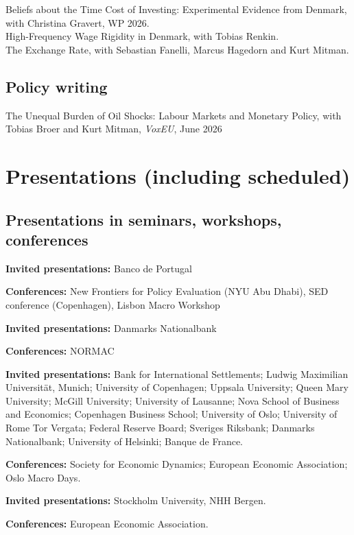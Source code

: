 \documentclass[11pt]{article} %
\begin{document}
Beliefs about the Time Cost of Investing: Experimental Evidence from Denmark, with Christina Gravert, WP 2026. \\

High-Frequency Wage Rigidity in Denmark, with Tobias Renkin.  \\

The Exchange Rate, with Sebastian Fanelli, Marcus Hagedorn and Kurt Mitman.

\subsection*{Policy writing}

The Unequal Burden of Oil Shocks: Labour Markets and Monetary Policy, with Tobias Broer and Kurt Mitman, \textit{VoxEU}, June 2026

\section*{Presentations (including scheduled)}

\subsection*{Presentations in seminars, workshops, conferences}
 \textbf{Invited presentations:} Banco de Portugal

 \textbf{Conferences:} New Frontiers for Policy Evaluation (NYU Abu Dhabi), SED conference (Copenhagen), Lisbon Macro Workshop

 \textbf{Invited presentations:} Danmarks Nationalbank

 \textbf{Conferences:} NORMAC

\textbf{Invited presentations:} Bank for International Settlements; Ludwig Maximilian Universit\"at, Munich; University of Copenhagen; Uppsala University; Queen Mary University; McGill University; University of Lausanne; Nova School of Business and Economics; Copenhagen Business School; University of Oslo; University of Rome Tor Vergata; Federal Reserve Board; Sveriges Riksbank; Danmarks Nationalbank; University of Helsinki; Banque de France.

\textbf{Conferences:} Society for Economic Dynamics; European Economic Association; Oslo Macro Days.

 \textbf{Invited presentations:} Stockholm University, NHH Bergen. 

\textbf{Conferences:} European Economic Association. 
 
\end{document}
